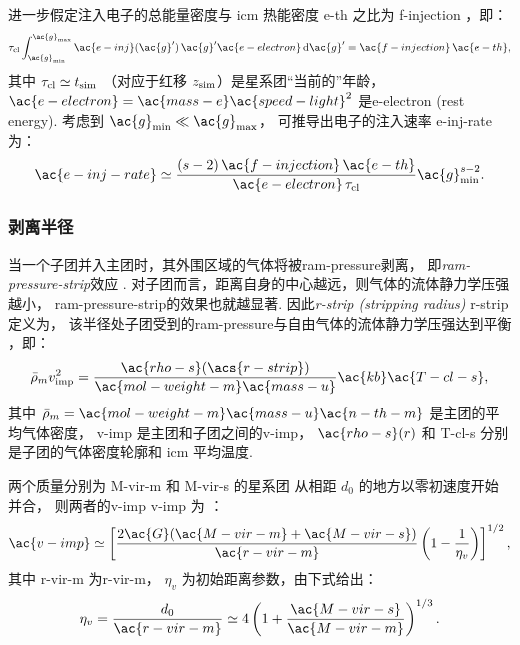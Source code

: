进一步假定注入电子的总能量密度与 \ac{icm} 热能密度 \ac{e-th} 之比为
\ac{f-injection} \cite{cassano2005}，即：
\begin{equation}
  \tau_{\R{cl}} \int_{\ac{g}_{\R{min}}}^{\ac{g}_{\R{max}}}
  \ac{e-inj}(\ac{g}') \,\ac{g}'\ac{e-electron} \,\D{\ac{g}'}
    = \ac{f-injection} \,\ac{e-th} ,
\end{equation}
其中
$\tau_{\mathrm{cl}} \simeq t_{\mathrm{sim}}$
（对应于红移 $z_{\mathrm{sim}}$）是星系团\enquote{当前的}年龄，
$\ac{e-electron} = \ac{mass-e} \ac{speed-light}^2$
是\acl{e-electron} (rest energy).
考虑到 $\ac{g}_{\R{min}} \ll \ac{g}_{\R{\max}}$，
可推导出电子的注入速率 \ac{e-inj-rate} 为：
\begin{equation}
  \label{eq:injrate}
  \ac{e-inj-rate} \simeq
    \frac{(s-2)\,\ac{f-injection}\,\ac{e-th}}{
      \ac{e-electron}\,\tau_{\R{cl}}} \ac{g}_{\R{min}}^{s-2} .
\end{equation}

\subsubsection{剥离半径}

当一个子团并入主团时，其外围区域的气体将被\ac{ram-pressure}剥离，
即\emph{\acf{ram-pressure-strip}}效应 \cite{gunn1972}.
对子团而言，距离自身的中心越远，则气体的流体静力学压强越小，
\ac{ram-pressure-strip}的效果也就越显著.
因此\emph{\acl{r-strip} (stripping radius)} \ac{r-strip} 定义为，
该半径处子团受到的\ac{ram-pressure}与自由气体的流体静力学压强达到平衡
\cite{cassano2005}，即：
\begin{equation}
  \label{eq:rs-eqp}
  \bar{\rho}_m v_{\R{imp}}^2
    = \frac{\ac{rho-s}(\acs{r-strip})}{\ac{mol-weight-m} \ac{mass-u}}
      \ac{kb} \ac{T-cl-s} ,
\end{equation}
其中
$\bar{\rho}_m = \ac{mol-weight-m} \ac{mass-u} \ac{n-th-m}$
是主团的平均气体密度，
\ac{v-imp} 是主团和子团之间的\acl{v-imp}，
$\ac{rho-s}(r)$ 和 \ac{T-cl-s} 分别是子团的气体密度轮廓和 \ac{icm} 平均温度.

两个质量分别为 \ac{M-vir-m} 和 \ac{M-vir-s} 的星系团
从相距 $d_0$ 的地方以零初速度开始并合，
则两者的\acl{v-imp} \ac{v-imp} 为 \cite{sarazin2002,cassano2005}：
\begin{equation}
  \label{eq:v-imp}
  \ac{v-imp} \simeq \left[
    \frac{2 \ac{G} (\ac{M-vir-m} + \ac{M-vir-s})}{\ac{r-vir-m}}
    \left( 1 - \frac{1}{\eta_v} \right)\right]^{1/2} ,
\end{equation}
其中
\ac{r-vir-m} 为\acl{r-vir-m}，
$\eta_v$ 为初始距离参数，由下式给出：
\begin{equation}
  \eta_v
    = \frac{d_0}{\ac{r-vir-m}}
    \simeq 4 \left( 1 + \frac{\ac{M-vir-s}}{\ac{M-vir-m}} \right)^{1/3} .
\end{equation}

